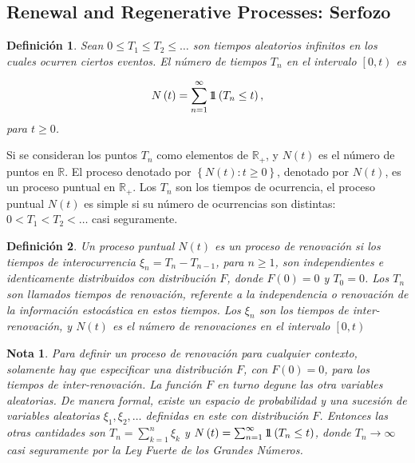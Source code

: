 \documentclass{article}
\newtheorem{Def}{Definición}
\newtheorem{Note}{Nota}
\newcommand{\rea}{\mathbb{R}}
\newcommand{\indora}{\mbox{$1$\hspace{-0.8ex}$1$}}
\begin{document}
\subsection{Renewal and Regenerative Processes: Serfozo\cite{Serfozo}}
\begin{Def}\label{Def.Tn}
Sean $0\leq T_{1}\leq T_{2}\leq \ldots$ son tiempos aleatorios infinitos en los cuales ocurren ciertos eventos. El n\'umero de tiempos $T_{n}$ en el intervalo $\left[0,t\right)$ es

\begin{eqnarray}
N\left(t\right)=\sum_{n=1}^{\infty}\indora\left(T_{n}\leq t\right),
\end{eqnarray}
para $t\geq0$.
\end{Def}

Si se consideran los puntos $T_{n}$ como elementos de $\rea_{+}$, y $N\left(t\right)$ es el n\'umero de puntos en $\rea$. El proceso denotado por $\left\{N\left(t\right):t\geq0\right\}$, denotado por $N\left(t\right)$, es un proceso puntual en $\rea_{+}$. Los $T_{n}$ son los tiempos de ocurrencia, el proceso puntual $N\left(t\right)$ es simple si su n\'umero de ocurrencias son distintas: $0<T_{1}<T_{2}<\ldots$ casi seguramente.

\begin{Def}
Un proceso puntual $N\left(t\right)$ es un proceso de renovaci\'on si los tiempos de interocurrencia $\xi_{n}=T_{n}-T_{n-1}$, para $n\geq1$, son independientes e identicamente distribuidos con distribuci\'on $F$, donde $F\left(0\right)=0$ y $T_{0}=0$. Los $T_{n}$ son llamados tiempos de renovaci\'on, referente a la independencia o renovaci\'on de la informaci\'on estoc\'astica en estos tiempos. Los $\xi_{n}$ son los tiempos de inter-renovaci\'on, y $N\left(t\right)$ es el n\'umero de renovaciones en el intervalo $\left[0,t\right)$
\end{Def}


\begin{Note}
Para definir un proceso de renovaci\'on para cualquier contexto, solamente hay que especificar una distribuci\'on $F$, con $F\left(0\right)=0$, para los tiempos de inter-renovaci\'on. La funci\'on $F$ en turno degune las otra variables aleatorias. De manera formal, existe un espacio de probabilidad y una sucesi\'on de variables aleatorias $\xi_{1},\xi_{2},\ldots$ definidas en este con distribuci\'on $F$. Entonces las otras cantidades son $T_{n}=\sum_{k=1}^{n}\xi_{k}$ y $N\left(t\right)=\sum_{n=1}^{\infty}\indora\left(T_{n}\leq t\right)$, donde $T_{n}\rightarrow\infty$ casi seguramente por la Ley Fuerte de los Grandes N\'umeros.
\end{Note}
\end{document}
